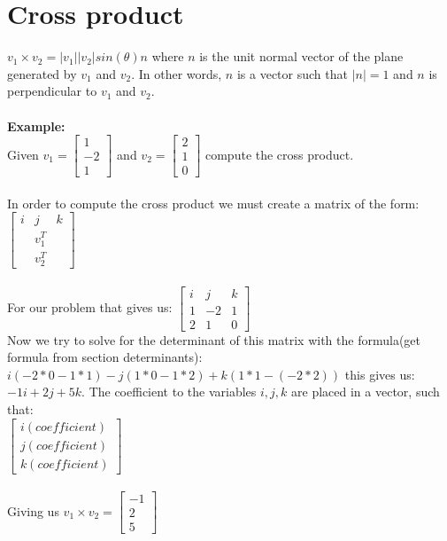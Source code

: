 \documentclass{article}
\begin{document}
\section{Cross product}
$v_1 \times v_2 = |v_1||v_2|sin(\theta)n$ where $n$ is the unit normal vector of the plane generated by $v_1$ and $v_2$. In other words, $n$ is a vector such that $|n|=1$ and $n$ is perpendicular to $v_1$ and $v_2$.\\\\
\textbf{Example: }\\
Given $v_1= \begin{bmatrix}
1 \\
-2 \\
1
\end{bmatrix}$ and 
$v_2= \begin{bmatrix}
2 \\
1 \\
0
\end{bmatrix}$ compute the cross product.\\\\
In order to compute the cross product we must create a matrix of the form: 
$\begin{bmatrix}
i & j & k \\
 & v_1^T & \\
 & v_2^T &
\end{bmatrix}$\\\\ 
For our problem that gives us: 
$\begin{bmatrix}
i & j & k \\
1 & -2 & 1\\
2 & 1 & 0
\end{bmatrix}$\\
Now we try to solve for the determinant of this matrix with the formula(get formula from section determinants): 
$i(-2*0 - 1*1) - j(1*0-1*2) + k(1*1-(-2*2))$ this gives us: $-1i + 2j + 5k$. The coefficient to the variables $i,j, k $ are placed in a vector, such that:\\
$\begin{bmatrix}
i (coefficient)\\
j (coefficient)\\
k (coefficient)
\end{bmatrix}$\\\\
Giving us $v_1 \times v_2 = \begin{bmatrix}
-1 \\
2 \\
5
\end{bmatrix}$
\end{document}
